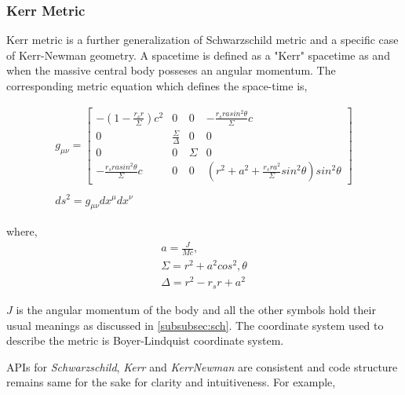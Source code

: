 \documentclass{aastex63}
\begin{document}

\subsubsection{Kerr Metric}\label{subsubsec:kerr}
Kerr metric is a further generalization of Schwarzschild metric and a specific case of Kerr-Newman geometry. A spacetime is defined as a "Kerr" spacetime as and when the massive central body posseses an angular momentum. The corresponding metric equation which defines the space-time is,

\begin{gather}
g_{\mu \nu} = \begin{bmatrix} - (1 - \frac{r_s r}{\Sigma})c^2 & 0 & 0 & -\frac{r_s r a sin^2 \theta}{\Sigma}c \\ 0 & \frac{\Sigma}{\Delta} & 0 & 0 \\ 0 & 0 & \Sigma & 0 \\ -\frac{r_s r a sin^2 \theta}{\Sigma}c & 0 & 0 &  (r^2 + a^2 + \frac{r_s r a^2}{\Sigma}sin^2 \theta) sin^2 \theta \end{bmatrix} \\ 
\nonumber \\
ds^2 = g_{\mu \nu} dx^\mu dx^\nu
\end{gather}

where,
\begin{gather}
a = \frac{J}{Mc}, \nonumber \\
\Sigma = r^2 + a^2 cos^2, \nonumber \theta \\
\Delta  = r^2 - r_s r + a^2 \nonumber
\end{gather}

$J$ is the angular momentum of the body and all the other symbols hold their usual meanings as discussed in \ref{subsubsec:sch}. The coordinate system used to describe the metric is Boyer-Lindquist coordinate system.

APIs for \textit{Schwarzschild}, \textit{Kerr} and \textit{KerrNewman} are consistent and code structure remains same for the sake for clarity and intuitiveness. For example,
\end{document}
